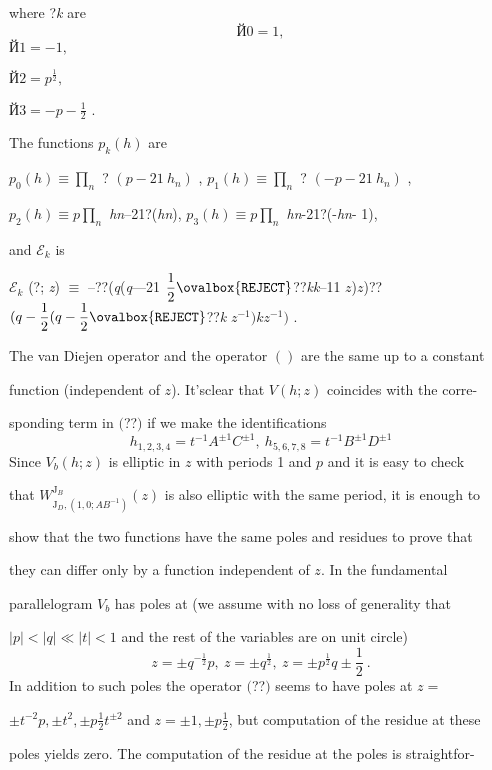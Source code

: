 \documentclass[a4paper,12pt]{article}
\begin{document}
where ?{\it k} are
$$
Й 0=1,
$$
$Й 1=-1,$

$Й 2=p^{\frac{1}{2}},$

$\displaystyle Й 3=-p-\frac{1}{2}$ .

The functions $p_{k}(h)$ are
\begin{center}
$p_{0}(h)\displaystyle \equiv\prod_{n}$ ? $(p- 21\ h_{n})$ , $p_{1}(h)\displaystyle \equiv\prod_{n}$ ? $(- p- 21\ h_{n})$ ,
\end{center}
$p_{2}(h)\displaystyle \equiv p\prod_{n}$ {\it hn}--21?({\it hn}), $p_{3}(h)\displaystyle \equiv p\prod_{n}$ {\it hn}-21?(-{\it hn}- 1),

and $\mathcal{E}_{k}$ is

$\mathcal{E}_{k}$ (?; {\it z}) $\equiv$ --??({\it q}({\it q}---21 $\displaystyle \frac{1}{2}\ovalbox{\tt\small REJECT}$??{\it kk}--11 $z$)$z$)?? $(q-\displaystyle \frac{1}{2}(q-\frac{1}{2}\ovalbox{\tt\small REJECT}$??{\it k} $z^{-1})kz^{-1})$ .

The van Diejen operator and the operator $()$ are the same up to a constant

function (independent of $z$). It’sclear that $V(h;z)$ coincides with the corre-

sponding term in $($??$)$ if we make the identifications
$$
h_{1,2,3,4}=t^{-1}A^{\pm 1}C^{\pm 1},\ h_{5,6,7,8}=t^{-1}B^{\pm 1}D^{\pm 1}
$$
Since $V_{b}(h;z)$ is elliptic in $z$ with periods 1 and $p$ and it is easy to check

that $W_{\mathrm{J}_{D},(1,0;AB^{-1})}^{\mathrm{J}_{B}}(z)$ is also elliptic with the same period, it is enough to

show that the two functions have the same poles and residues to prove that

they can differ only by a function independent of $z$. In the fundamental

parallelogram $V_{b}$ has poles at (we assume with no loss of generality that

$|p| < |q| \ll |t| < 1$ and the rest of the variables are on unit circle)
$$
z=\pm q^{-\frac{1}{2}}p,\ z=\pm q^{\frac{1}{2}},\ z=\pm p^{\frac{1}{2}}q\pm\frac{1}{2}\ .
$$
In addition to such poles the operator $($??$)$ seems to have poles at $z =$

$\pm t^{-2}p, \pm t^{2}, \displaystyle \pm p\frac{1}{2}t^{\pm 2}$ and $z=\pm 1, \displaystyle \pm p\frac{1}{2}$, but computation of the residue at these

poles yields zero. The computation of the residue at the poles is straightfor-
\end{document}
